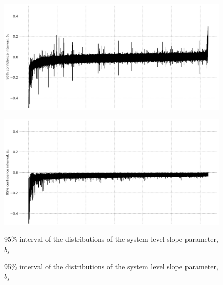 \documentclass[a4paper]{article}
\begin{document}

\begin{figure}
\begin{minipage}{.45\textwidth}
  \centering
  \includegraphics[width=1\linewidth]{figures/Bay_bs.png}
  \label{sfig:Bay_bs}
 \end{minipage}\qquad
\begin{minipage}{.45\textwidth}
  \centering
  \includegraphics[width=1\linewidth]{figures/Bay_bs_const.png}
  \label{sfig:Bay_bs_const}
 \end{minipage}

\bigskip

\begin{minipage}[t]{.45\textwidth}
\centering
 \caption{95\% interval of the distributions of the system level slope parameter, $b_s$}
\end{minipage}\qquad
\begin{minipage}[t]{.45\textwidth}
\centering
  \caption{95\% interval of the distributions of the system level slope parameter, $b_s$}
\end{minipage}
\end{figure}
\end{document}

